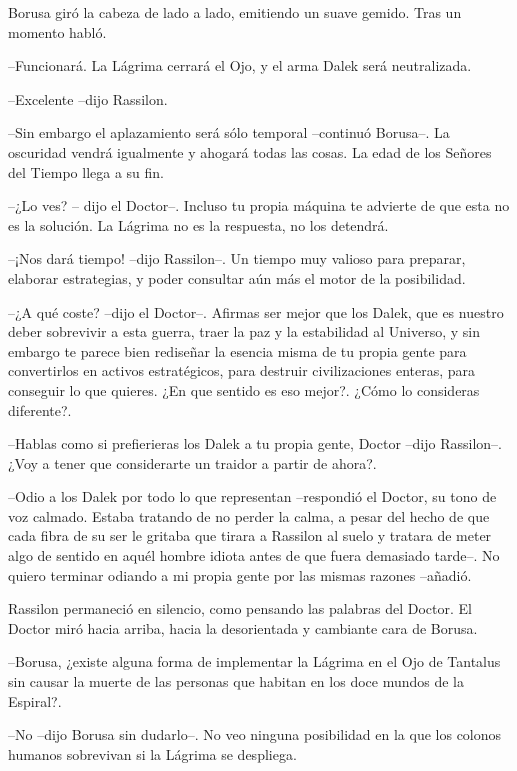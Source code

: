  

Borusa giró la cabeza de lado a lado, emitiendo un suave gemido. Tras un momento habló. 



--Funcionará. La Lágrima cerrará el Ojo, y el arma Dalek será neutralizada. 

--Excelente --dijo Rassilon. 

--Sin embargo el aplazamiento será sólo temporal --continuó Borusa--. La oscuridad vendrá igualmente y ahogará todas las cosas. La edad de los Señores del Tiempo llega a su fin. 

--¿Lo ves? -- dijo el Doctor--. Incluso tu propia máquina te advierte de que esta no es la solución. La Lágrima no es la respuesta, no los detendrá.  

--¡Nos dará tiempo! --dijo Rassilon--. Un tiempo muy valioso para preparar, elaborar estrategias, y poder consultar aún más el motor de la posibilidad.  

--¿A qué coste? --dijo el Doctor--. Afirmas ser mejor que los Dalek, que es nuestro deber sobrevivir a esta guerra, traer la paz y la estabilidad al Universo, y sin embargo te parece bien rediseñar la esencia misma de tu propia gente para convertirlos en activos estratégicos, para destruir civilizaciones enteras, para conseguir lo que quieres. ¿En que sentido es eso mejor?. ¿Cómo lo consideras diferente?. 

--Hablas como si prefierieras los Dalek a tu propia gente, Doctor --dijo Rassilon--. ¿Voy a tener que considerarte un traidor a partir de ahora?. 

--Odio a los Dalek por todo lo que representan --respondió el Doctor, su tono de voz calmado. Estaba tratando de no perder la calma, a pesar del hecho de que cada fibra de su ser le gritaba que tirara a Rassilon al suelo y tratara de meter algo de sentido en aquél hombre idiota antes de que fuera demasiado tarde--. No quiero terminar odiando a mi propia gente por las mismas razones --añadió. 



Rassilon permaneció en silencio, como pensando las palabras del Doctor. El Doctor miró hacia arriba, hacia la desorientada y cambiante cara de Borusa. 



--Borusa, ¿existe alguna forma de implementar la Lágrima en el Ojo de Tantalus sin causar la muerte de las personas que habitan en los doce mundos de la Espiral?. 

--No --dijo Borusa sin dudarlo--. No veo ninguna posibilidad en la que los colonos humanos sobrevivan si la Lágrima se despliega. 



